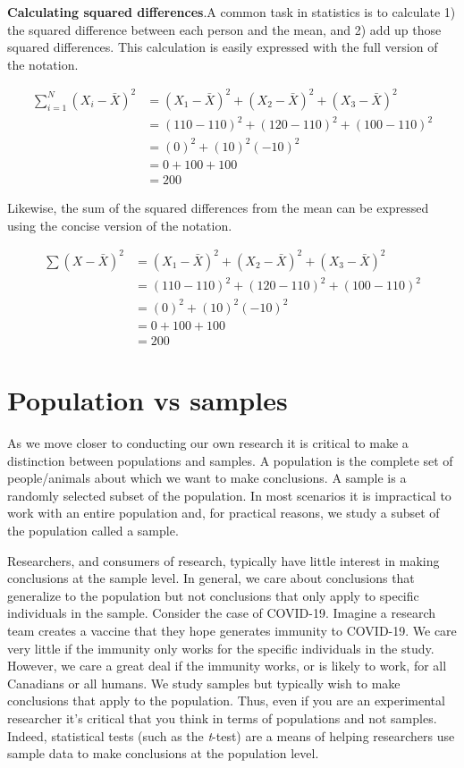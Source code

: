 \documentclass[
]{krantz}
\begin{document}
\textbf{Calculating squared differences}.A common task in statistics is to calculate 1) the squared difference between each person and the mean, and 2) add up those squared differences. This calculation is easily expressed with the full version of the notation.

\[
\begin{aligned} 
\sum_{i=1}^{N}{(X_i - \bar{X})^2} &= (X_1-\bar{X})^2 + (X_2-\bar{X})^2 + (X_3-\bar{X})^2\\ 
&= (110-110)^2 + (120-110)^2 + (100-110)^2\\
&= (0)^2 + (10)^2 (-10)^2 \\
&= 0 + 100 + 100 \\
&= 200
\end{aligned} 
\]

Likewise, the sum of the squared differences from the mean can be expressed using the concise version of the notation.

\[
\begin{aligned} 
\sum{(X - \bar{X})^2} &= (X_1-\bar{X})^2 + (X_2-\bar{X})^2 + (X_3-\bar{X})^2\\ 
&= (110-110)^2 + (120-110)^2 + (100-110)^2\\
&= (0)^2 + (10)^2 (-10)^2 \\
&= 0 + 100 + 100 \\
&= 200
\end{aligned} 
\]

\hypertarget{population-vs-samples}{%
\section{Population vs samples}\label{population-vs-samples}}

As we move closer to conducting our own research it is critical to make a distinction between populations and samples. A population is the complete set of people/animals about which we want to make conclusions. A sample is a randomly selected subset of the population. In most scenarios it is impractical to work with an entire population and, for practical reasons, we study a subset of the population called a sample.

Researchers, and consumers of research, typically have little interest in making conclusions at the sample level. In general, we care about conclusions that generalize to the population but not conclusions that only apply to specific individuals in the sample. Consider the case of COVID-19. Imagine a research team creates a vaccine that they hope generates immunity to COVID-19. We care very little if the immunity only works for the specific individuals in the study. However, we care a great deal if the immunity works, or is likely to work, for all Canadians or all humans. We study samples but typically wish to make conclusions that apply to the population. Thus, even if you are an experimental researcher it's critical that you think in terms of populations and not samples. Indeed, statistical tests (such as the \emph{t}-test) are a means of helping researchers use sample data to make conclusions at the population level.
\end{document}

